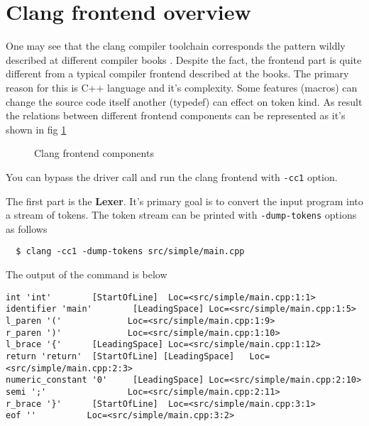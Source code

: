 \section{Clang frontend overview}
One may see that the clang compiler toolchain corresponds the pattern
wildly described at different compiler books
\cite{book:engineering_a_compiler}. Despite the fact, the frontend
part is quite different from a typical compiler frontend described at
the books. The primary reason for this is C++ language and it's
complexity. Some features (macros) can change the source code itself
another (typedef) can effect on token kind. As result the relations
between different frontend components can be represented as it's shown
in fig \ref{fig:clang_frontend}

\begin{figure}
  \begin{center}
  \end{center}
  \caption{{Clang frontend components}}
  \label{fig:clang_frontend}
\end{figure}


You can bypass the driver call and run the clang frontend  with
\texttt{-cc1} option. 

The first part is the \textbf{Lexer}. It's primary goal is to convert the input
program into a stream of tokens. The token stream can be printed with
\texttt{-dump-tokens} options as follows
\begin{verbatim}
  $ clang -cc1 -dump-tokens src/simple/main.cpp
\end{verbatim}
The output of the command is below
\begin{verbatim}
int 'int'        [StartOfLine]  Loc=<src/simple/main.cpp:1:1>
identifier 'main'        [LeadingSpace] Loc=<src/simple/main.cpp:1:5>
l_paren '('             Loc=<src/simple/main.cpp:1:9>
r_paren ')'             Loc=<src/simple/main.cpp:1:10>
l_brace '{'      [LeadingSpace] Loc=<src/simple/main.cpp:1:12>
return 'return'  [StartOfLine] [LeadingSpace]   Loc=<src/simple/main.cpp:2:3>
numeric_constant '0'     [LeadingSpace] Loc=<src/simple/main.cpp:2:10>
semi ';'                Loc=<src/simple/main.cpp:2:11>
r_brace '}'      [StartOfLine]  Loc=<src/simple/main.cpp:3:1>
eof ''          Loc=<src/simple/main.cpp:3:2>
\end{verbatim}

